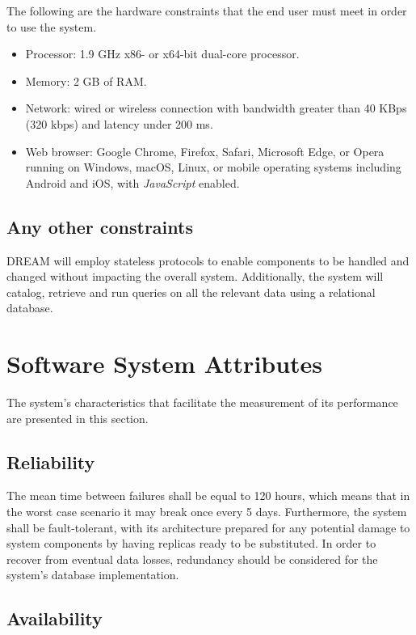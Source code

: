 The following are the hardware constraints that the end user must meet in order to use the system.

\begin{itemize}
    \item Processor: 1.9 GHz x86- or x64-bit dual-core processor.
    \item Memory: 2 GB of RAM.
    \item Network: wired or wireless connection with bandwidth greater than 40 KBps (320 kbps) and latency under 200 ms.
    \item Web browser: Google Chrome, Firefox, Safari, Microsoft Edge, or Opera running on Windows, macOS, Linux, or mobile operating systems including Android and iOS, with \textit{JavaScript} enabled.
\end{itemize}

\subsection{Any other constraints}

DREAM will employ stateless protocols to enable components to be handled and changed without impacting the overall system. Additionally, the system will catalog, retrieve and run queries on all the relevant data using a relational database.

\section{Software System Attributes}

The system's characteristics that facilitate the measurement of its performance are presented in this section.

\subsection{Reliability}

The mean time between failures shall be equal to 120 hours, which means that in the worst case scenario it may break once every 5 days. Furthermore, the system shall be fault-tolerant, with its architecture prepared for any potential damage to system components by having replicas ready to be substituted. In order to recover from eventual data losses, redundancy should be considered for the system's database implementation.

\subsection{Availability}

